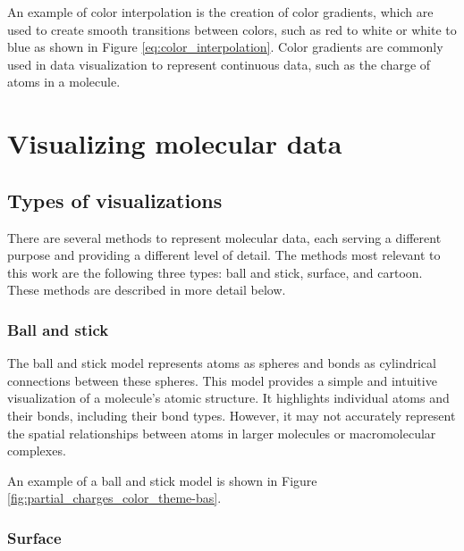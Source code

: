 \documentclass[
  digital,     %
  oneside,     %
  nosansbold,  %
  nocolorbold, %
  lof,         %
  lot,         %
]{fithesis4}
\begin{document}
An example of color interpolation is the creation of color gradients, which are used to create smooth transitions between colors, such as red to white or white to blue as shown in Figure \ref{eq:color_interpolation}. Color gradients are commonly used in data visualization to represent continuous data, such as the charge of atoms in a molecule.

\newpage
\chapter{Visualizing molecular data}
\label{chapter:visualizing_molecular_data}



\section{Types of visualizations}
\label{section:types_of_visualizations}


There are several methods to represent molecular data, each serving a different purpose and providing a different level of detail. The methods most relevant to this work are the following three types: ball and stick, surface, and cartoon. These methods are described in more detail below.

\subsection{Ball and stick}
\label{subsection:ball_and_stick}

The ball and stick model represents atoms as spheres and bonds as cylindrical connections between these spheres. This model provides a simple and intuitive visualization of a molecule's atomic structure. It highlights individual atoms and their bonds, including their bond types. However, it may not accurately represent the spatial relationships between atoms in larger molecules or macromolecular complexes.

An example of a ball and stick model is shown in Figure \ref{fig:partial_charges_color_theme-bas}.

\subsection{Surface}
\label{subsection:surface}
\end{document}
